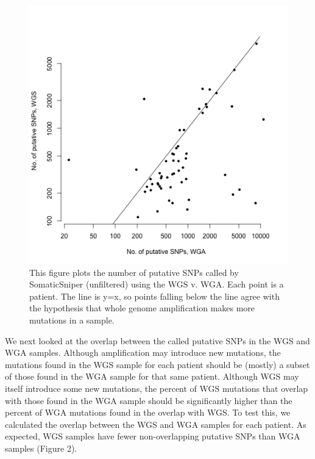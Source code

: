 \documentclass[11pt]{article} %
\begin{document}
\begin{figure}
\includegraphics[scale=0.5]{C282_v_C484.png}
\caption{This figure plots the number of putative SNPs called by SomaticSniper (unfiltered) using the WGS v. WGA. Each point is a patient. The line is y=x, so points falling below the line agree with the hypothesis that whole genome amplification makes more mutations in a sample.}
\end{figure}

We next looked at the overlap between the called putative SNPs in the WGS and WGA samples. Although amplification may introduce new mutations, the mutations found in the WGS sample for each patient should be (mostly) a subset of those found in the WGA sample for that same patient. Although WGS may itself introduce some new mutations, the percent of WGS mutations that overlap with those found in the WGA sample should be significantly higher than the percent of WGA mutations found in the overlap with WGS. To test this, we calculated the overlap between the WGS and WGA samples for each patient. As expected, WGS samples have fewer non-overlapping putative SNPs than WGA samples (Figure 2). 
\end{document}
